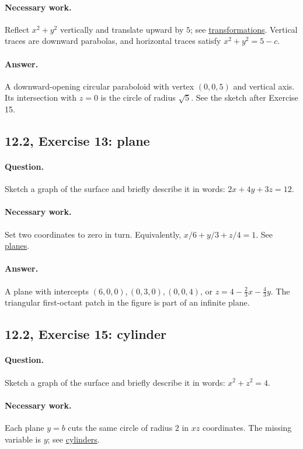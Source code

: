 \paragraph{Necessary work.} Reflect $x^2+y^2$ vertically and translate upward by $5$; see \hyperref[transform]{transformations}. Vertical traces are downward parabolas, and horizontal traces satisfy $x^2+y^2=5-c$.
\paragraph{Answer.} A downward-opening circular paraboloid with vertex $(0,0,5)$ and vertical axis. Its intersection with $z=0$ is the circle of radius $\sqrt5$. See the sketch after Exercise 15.

\subsection{12.2, Exercise 13: plane}
\paragraph{Question.} Sketch a graph of the surface and briefly describe it in words: $2x+4y+3z=12$.
\paragraph{Necessary work.} Set two coordinates to zero in turn. Equivalently, $x/6+y/3+z/4=1$. See \hyperref[plane]{planes}.
\paragraph{Answer.} A plane with intercepts $(6,0,0),(0,3,0),(0,0,4)$, or $z=4-\frac23x-\frac43y$. The triangular first-octant patch in the figure is part of an infinite plane.

\subsection{12.2, Exercise 15: cylinder}
\paragraph{Question.} Sketch a graph of the surface and briefly describe it in words: $x^2+z^2=4$.
\paragraph{Necessary work.} Each plane $y=b$ cuts the same circle of radius $2$ in $xz$ coordinates. The missing variable is $y$; see \hyperref[cylinder]{cylinders}.
